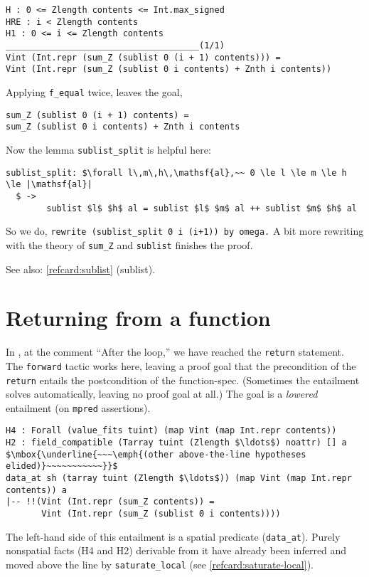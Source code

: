 \documentclass[12pt,fleqn,openany,oneside,showtrims]{memoir}
\begin{document}
\begin{lstlisting}
H : 0 <= Zlength contents <= Int.max_signed
HRE : i < Zlength contents
H1 : 0 <= i <= Zlength contents
______________________________________(1/1)
Vint (Int.repr (sum_Z (sublist 0 (i + 1) contents))) =
Vint (Int.repr (sum_Z (sublist 0 i contents) + Znth i contents))
\end{lstlisting}

Applying \lstinline{f_equal} twice, leaves the goal,
\begin{lstlisting}
sum_Z (sublist 0 (i + 1) contents) =
sum_Z (sublist 0 i contents) + Znth i contents
\end{lstlisting}
Now the lemma \lstinline{sublist_split} is helpful here:\label{sublist-split1}
\begin{lstlisting}
sublist_split: $\forall l\,m\,h\,\mathsf{al},~~ 0 \le l \le m \le h \le |\mathsf{al}|
  $ ->
        sublist $l$ $h$ al = sublist $l$ $m$ al ++ sublist $m$ $h$ al
\end{lstlisting}
So we do,
\lstinline{rewrite (sublist_split 0 i (i+1)) by omega.}
A bit more rewriting with the theory of
\lstinline{sum_Z} and \lstinline{sublist} finishes the proof.

See also: \autoref{refcard:sublist} (sublist).

\chapter{Returning from a function}
\label{refcard:return}
In , at the comment ``After the loop,'' we have reached the \lstinline{return} statement.
The \lstinline{forward} tactic works here, leaving a proof goal
that the precondition of the \lstinline{return}
entails the postcondition of the function-spec.
(Sometimes the entailment solves automatically, leaving no proof goal at all.)
The goal is a \emph{lowered} entailment (on
\lstinline{mpred} assertions).

\begin{lstlisting}
H4 : Forall (value_fits tuint) (map Vint (map Int.repr contents))
H2 : field_compatible (Tarray tuint (Zlength $\ldots$) noattr) [] a
$\mbox{\underline{~~~\emph{(other above-the-line hypotheses elided)}~~~~~~~~~~~}}$
data_at sh (tarray tuint (Zlength $\ldots$)) (map Vint (map Int.repr contents)) a
|-- !!(Vint (Int.repr (sum_Z contents)) =
       Vint (Int.repr (sum_Z (sublist 0 i contents))))
\end{lstlisting}

The left-hand side of this entailment is a
spatial predicate (\lstinline{data_at}).
Purely nonspatial facts (H4 and H2) derivable from it
have already been inferred and
moved above the line by
\lstinline{saturate_local} (see \autoref{refcard:saturate-local}).
\end{document}
